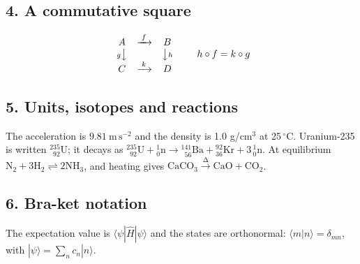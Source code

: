 \documentclass[11pt]{article}
\begin{document}
\subsection*{4. A commutative square}
\[
\begin{array}{ccc}
 A & \xrightarrow{\;f\;} & B \\
 {\scriptstyle g}\big\downarrow & & \big\downarrow{\scriptstyle h} \\
 C & \xrightarrow{\;k\;} & D
\end{array}
\qquad h \circ f = k \circ g
\]

\subsection*{5. Units, isotopes and reactions}
The acceleration is $9.81\ \mathrm{m\,s^{-2}}$ and the density is 1.0 g/cm$^3$ at 25\,$^\circ$C.
Uranium-235 is written ${}^{235}_{\phantom{0}92}\mathrm{U}$; it decays as
${}^{235}_{\phantom{0}92}\mathrm{U} + {}^{1}_{0}\mathrm{n} \rightarrow {}^{141}_{\phantom{0}56}\mathrm{Ba} + {}^{92}_{36}\mathrm{Kr} + 3\,{}^{1}_{0}\mathrm{n}$.
At equilibrium $\mathrm{N_2 + 3H_2 \rightleftharpoons 2NH_3}$, and heating gives
$\mathrm{CaCO_3 \xrightarrow{\Delta} CaO + CO_2}$.

\subsection*{6. Bra-ket notation}
The expectation value is $\langle \psi | \hat{H} | \psi \rangle$ and the states are orthonormal:
$\langle m | n \rangle = \delta_{mn}$, with $|\psi\rangle = \sum_n c_n |n\rangle$.
\end{document}
